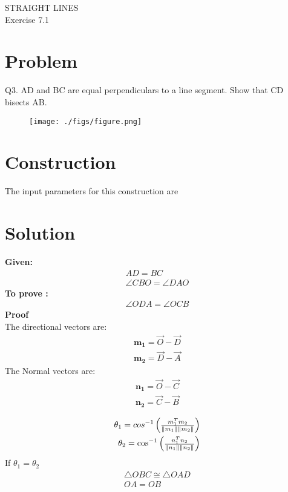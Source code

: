\documentclass[10pt,a4paper]{article}
\title{\mytitle}
\newcommand{\myvec}[1]{\ensuremath{\begin{pmatrix}#1\end{pmatrix}}}
\let\vec\mathbf
\begin{document}
\begin{center}
\textbf\large{ STRAIGHT LINES}\\
\textbf\large{Exercise 7.1}
\end{center}

\tableofcontents
\section{Problem}
Q3. AD and BC are equal perpendiculars to a line segment. Show that CD bisects AB.
\begin{figure}[!h]
	\begin{center}
		\texttt{[image: ./figs/figure.png]}
	\end{center}
\caption{}
\label{figure}
\end{figure}
\pagebreak
\section{Construction}
The input parameters for this construction are
\begin{table}[!h]
\centering

\caption{}
\label{Inputs}
\end{table}
\section{Solution}
\textbf{Given:}
\begin{align}
    AD=BC\\
    \angle{CBO}=\angle{DAO}
\end{align}
\textbf{To prove :}
\begin{align}
    \angle{ODA}=\angle{OCB}
\end{align}
\textbf{Proof}\\
The directional vectors are:
\begin{align}
    \vec{m_1}=\Vec{O}-\Vec{D}\\
    \vec{m_2}=\Vec{D}-\Vec{A}
\end{align}
The Normal vectors are:
\begin{align}
    \vec{n_1}=\Vec{O}-\Vec{C}\\
    \vec{n_2}=\Vec{C}-\Vec{B}\\
\end{align}
\begin{align}
	\theta_1 =cos^{-1}\myvec{\frac{m_1^{T}m_2}{\norm{m_1}\norm{m_2}}}\\
	\theta_2 =\cos^{-1}\myvec{\frac{n_1^Tn_2}{\norm{n_1}\norm{n_2}}}
\end{align}
If $\theta_1 = \theta_2$
\begin{align}
    \triangle{OBC} \cong \triangle{OAD}\\
    OA = OB
\end{align}
\end{document}
